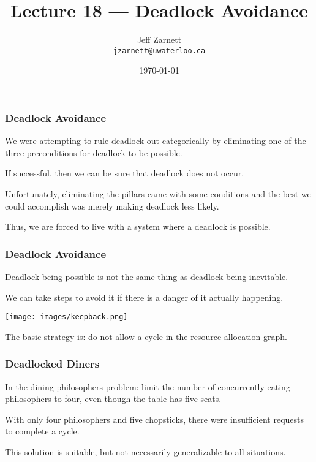 

\title{Lecture 18 --- Deadlock Avoidance }

\author{Jeff Zarnett \\ \small \texttt{jzarnett@uwaterloo.ca}}
\date{\today}




\begin{frame}
	\titlepage

\end{frame}

\begin{frame}
	\frametitle{Deadlock Avoidance}

	We were attempting to rule deadlock out categorically by eliminating one of the three preconditions for deadlock to be possible.

	If successful, then we can be sure that deadlock does not occur.

	Unfortunately, eliminating the pillars came with some conditions and the best we could accomplish was merely making deadlock less likely.

	Thus, we are forced to live with a system where a deadlock is possible.
\end{frame}


\begin{frame}
	\frametitle{Deadlock Avoidance}

	Deadlock being possible is not the same thing as deadlock being inevitable.

	We can take steps to avoid it if there is a danger of it actually happening.

	\begin{center}
		\texttt{[image: images/keepback.png]}
	\end{center}

	The basic strategy is: do not allow a cycle in the resource allocation graph.


\end{frame}

\begin{frame}
	\frametitle{Deadlocked Diners}

	In the dining philosophers problem: limit the number of concurrently-eating philosophers to four, even though the table has five seats.

	With only four philosophers and five chopsticks, there were insufficient requests to complete a cycle.

	This solution is suitable, but not necessarily generalizable to all situations.

\end{frame}


